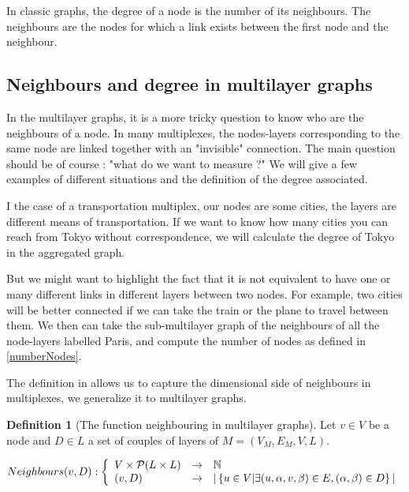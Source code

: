 \documentclass[dvipsnames,a4paper,11pt]{article}
\theoremstyle{definition}
\newtheorem{defn}{Definition}
\theoremstyle{remark}
\theoremstyle{remark}
\begin{document}
		In classic graphs, the degree of a node is the number of its neighbours. The neighbours are the nodes for which a link exists between the first node and the neighbour.
		
		\subsection{Neighbours and degree in multilayer graphs}
		
		In the multilayer graphs, it is a more tricky question to know who are the neighbours of a node. In many multiplexes, the nodes-layers corresponding to the same node are linked together with an "invisible" connection. The main question should be of course : "what do we want to measure ?" We will give a few examples of different situations and the definition of the degree associated.
		
		I the case of a transportation multiplex, our nodes are some cities, the layers are different means of transportation. If we want to know how many cities you can reach from Tokyo without correspondence, we will calculate the degree of Tokyo in the aggregated graph.
		
		But we might want to highlight the fact that it is not equivalent to have one or many different links in different layers between two nodes. For example, two cities will be better connected if we can take the train or the plane to travel between them.  We then can take the sub-multilayer graph of the neighbours of all the node-layers labelled Paris, and compute the number of nodes as defined in \ref{numberNodes}. 
		
		The definition in \cite{BERL} allows us to capture the dimensional side of neighbours in multiplexes, we generalize it to multilayer graphs.
		
		\begin{defn}[The function neighbouring in multilayer graphs]
		 Let $v \in V$ be a node and $D \in L$ a set of couples of layers of $M=(V_M,E_M,V,L)$. 
		 
		 $Neighbours(v,D): \left\{ 
		 	\begin{array}{lcl}
		 		V\times {\cal P}(L \times L)& \rightarrow & \mathbb{N}\\
		 		(v,D) & \rightarrow & |\left\{u \in V | \exists (u,\alpha,v,\beta) \in E, (\alpha,\beta) \in D\right\}|
		 	\end{array}
		 	\right.$
		
		\end{defn}
		
\end{document}
